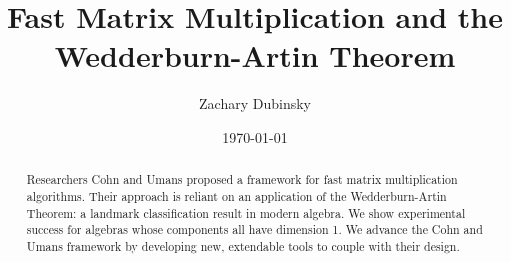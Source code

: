 \documentclass[honors]{union-cs-thesis}
\theoremstyle{nonumberplain}
\begin{document}

\title{Fast Matrix Multiplication and the Wedderburn-Artin Theorem}
\author{Zachary Dubinsky}
\date{\today}


\maketitle

\begin{abstract}
Researchers Cohn and Umans \cite{CohnOld}\cite{CohnNew} proposed a framework for fast matrix multiplication algorithms. Their approach is reliant on an application of the Wedderburn-Artin Theorem: a landmark classification result in modern algebra. We show experimental success for algebras whose components all have dimension 1. We advance the Cohn and Umans framework by developing new, extendable tools to couple with their design. 
\end{abstract}

\tableofcontents
\listoffigures %
\listoftables %
\makepreamble

    














\printbibliography{}
\end{document}
